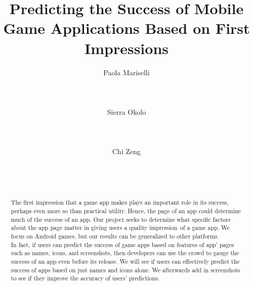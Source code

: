 \documentclass{sigchi}
\begin{document}
\title{Predicting the Success of Mobile Game Applications Based on First Impressions}

\author{
  \alignauthor Paola Mariselli\\
    \\
    \\
    \\
  \alignauthor Sierra Okolo\\
    \\
    \\
    \\
  \alignauthor Chi Zeng\\
    \\
    \\
    \\
}

\maketitle
\begin{abstract}

The first impression that a game app makes plays an important role in its success, perhaps even more so than practical utility. Hence, the page of an app could determine much of the success of an app. Our project seeks to determine what specific factors about the app page matter in giving users a quality impression of a game app. We focus on Android games, but our results can be generalized to other platforms. \\

In fact, if users can predict the success of game apps based on features of app' pages such as names, icons, and screenshots, then developers can use the crowd to gauge the success of an app even before its release. We will see if users can effectively predict the success of apps based on just names and icons alone. We afterwards add in screenshots to see if they improve the accuracy of users' predictions. 

\end{abstract}











\end{document}
